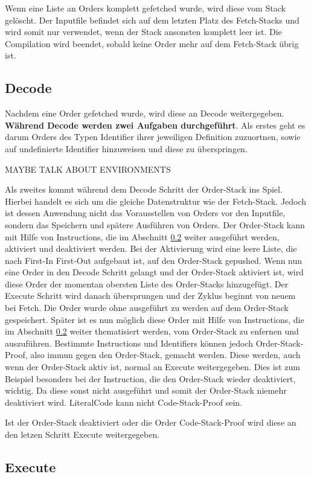 Wenn eine Liste an Orders komplett gefetched wurde, wird diese vom Stack gelöscht. Der Inputfile befindet sich auf dem letzten Platz des Fetch-Stacks und wird somit nur verwendet, wenn der Stack ansonsten komplett leer ist.
Die Compilation wird beendet, sobald keine Order mehr auf dem Fetch-Stack übrig ist.

\subsection{Decode} \label{sec:qhs-decode}
Nachdem eine Order gefetched wurde, wird diese an Decode weitergegeben. \textbf{Während Decode werden zwei Aufgaben durchgeführt}.
Als erstes geht es darum Orders des Typen Identifier ihrer jeweiligen Definition zuzuortnen, sowie auf undefinierte Identifier hinzuweisen und diese zu überspringen.

MAYBE TALK ABOUT ENVIRONMENTS

Als zweites kommt während dem Decode Schritt der Order-Stack ins Spiel. Hierbei handelt es sich um die gleiche Datenstruktur wie der Fetch-Stack. Jedoch ist dessen Anwendung nicht das Vorausstellen von Orders vor den Inputfile,
sondern das Speichern und spätere Ausführen von Orders. Der Order-Stack kann mit Hilfe von Instructions, die im Abschnitt \ref{sec:qhs-execute} weiter ausgeführt werden, aktiviert und deaktiviert werden.
Bei der Aktivierung wird eine leere Liste, die nach First-In First-Out aufgebaut ist, auf den Order-Stack gepushed. Wenn nun eine Order in den Decode Schritt gelangt und der Order-Stack aktiviert ist,
wird diese Order der momentan obersten Liste des Order-Stacks hinzugefügt. Der Execute Schritt wird danach übersprungen und der Zyklus beginnt von neuem bei Fetch. Die Order wurde ohne ausgeführt zu werden auf dem Order-Stack gespeichert.
Später ist es nun möglich diese Order mit Hilfe von Instructions, die im Abschnitt \ref{sec:qhs-execute} weiter thematisiert werden, vom Order-Stack zu enfernen und auszuführen.
Bestimmte Instructions und Identifiers können jedoch Order-Stack-Proof, also immun gegen den Order-Stack, gemacht werden. Diese werden, auch wenn der Order-Stack aktiv ist, normal an Execute weitergegeben.
Dies ist zum Beispiel besonders bei der Instruction, die den Order-Stack wieder deaktiviert, wichtig. Da diese sonst nicht ausgeführt und somit der Order-Stack niemehr deaktiviert wird.
LiteralCode kann nicht Code-Stack-Proof sein.

Ist der Order-Stack deaktiviert oder die Order Code-Stack-Proof wird diese an den letzen Schritt Execute weitergegeben.

\subsection{Execute} \label{sec:qhs-execute}